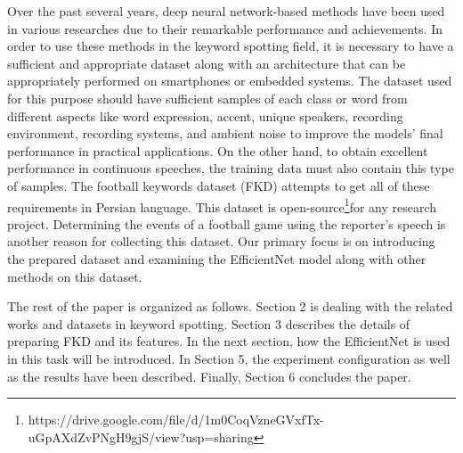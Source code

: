 \documentclass{article}
\begin{document}
Over the past several years, deep neural network-based methods have been used in various researches due to their remarkable performance and achievements. In order to use these methods in the keyword spotting field, it is necessary to have a sufficient and appropriate dataset along with an architecture that can be appropriately performed on smartphones or embedded systems. The dataset used for this purpose should have sufficient samples of each class or word from different aspects like word expression, accent, unique speakers, recording environment, recording systems, and ambient noise to improve the models' final performance in practical applications. On the other hand, to obtain excellent performance in continuous speeches, the training data must also contain this type of samples. The football keywords dataset (FKD) attempts to get all of these requirements in Persian language. This dataset is open-source\footnote{https://drive.google.com/file/d/1m0CoqVzneGVxfTx-uGpAXdZvPNgH9gjS/view?usp=sharing}for any research project. Determining the events of a football game using the reporter's speech is another reason for collecting this dataset. Our primary focus is on introducing the prepared dataset and examining the EfficientNet model \cite{eff} along with other methods on this dataset.

The rest of the paper is organized as follows. Section 2 is dealing with the related works and datasets in keyword spotting. Section 3 describes the details of preparing FKD and its features. In the next section, how the EfficientNet is used in this task will be introduced. In Section 5, the experiment configuration as well as the results have been described. Finally, Section 6 concludes the paper.
\end{document}
